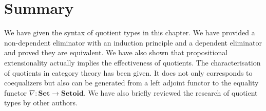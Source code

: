 \section{Summary}

We have given the syntax of quotient types in this chapter. We have provided a non-dependent eliminator with an induction principle and a dependent eliminator and proved they are equivalent. We have also shown that propositional extensionality actually implies the effectiveness of quotients. The characterisation of quotients in category theory has been given. It does not only corresponds to coequalizers but also can be generated from a left adjoint functor to the equality functor $\nabla : \textbf{Set} \to \textbf{Setoid}$. We have also briefly reviewed the research of quotient types by other authors.






